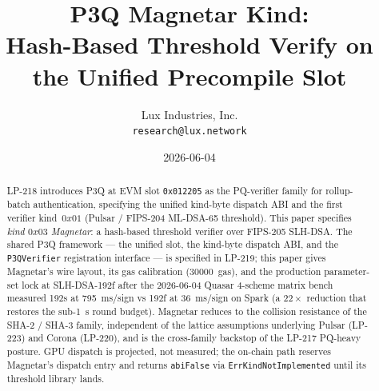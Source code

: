 \documentclass[11pt,a4paper]{article}
\title{P3Q Magnetar Kind:\\
       Hash-Based Threshold Verify on the Unified Precompile Slot}
\author{Lux Industries, Inc. \\
        \texttt{research@lux.network}}
\date{2026-06-04}
\begin{document}
\luxcoverpage

\begin{abstract}
LP-218 introduces P3Q at EVM slot \texttt{0x012205} as the
PQ-verifier family for rollup-batch authentication, specifying the
unified kind-byte dispatch ABI and the first verifier
kind~$0x01$ (Pulsar / FIPS-204 ML-DSA-65 threshold). This paper specifies \emph{kind $0x03$ Magnetar}: a hash-based
threshold verifier over FIPS-205 SLH-DSA. The shared P3Q framework
--- the unified slot, the kind-byte dispatch ABI, and the
\texttt{P3QVerifier} registration interface --- is specified in
LP-219; this paper gives Magnetar's wire layout, its gas
calibration (\SI{30000}{gas}), and the production parameter-set
lock at SLH-DSA-192f after the 2026-06-04 Quasar 4-scheme matrix
bench measured 192s at \SI{795}{ms}/sign vs 192f at
\SI{36}{ms}/sign on Spark (a $22\times$ reduction that restores
the sub-\SI{1}{s} round budget). Magnetar reduces to the collision
resistance of the SHA-2 / SHA-3 family, independent of the lattice
assumptions underlying Pulsar (LP-223) and Corona (LP-220), and is
the cross-family backstop of the LP-217 PQ-heavy posture. GPU
dispatch is projected, not measured; the on-chain path reserves
Magnetar's dispatch entry and returns \texttt{abiFalse} via
\texttt{ErrKindNotImplemented} until its threshold library lands.
\end{abstract}

\tableofcontents
\newpage






\end{document}
